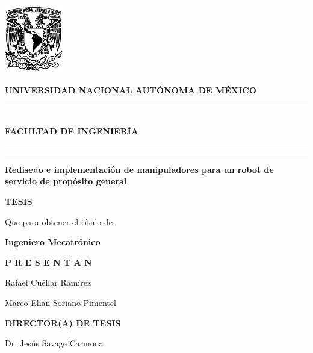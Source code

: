 \documentclass[12pt,twoside]{report}
\begin{document}
\thispagestyle{empty}

\begin{minipage}[t]{20cm}
  \includegraphics[height=3.0cm]{images/escudounam_negro.jpg}
  \hspace{0.5cm}
  \begin{minipage}[b]{14cm}
    \centering
    {\large \textbf{UNIVERSIDAD NACIONAL AUTÓNOMA DE MÉXICO}}\\[6pt]
    \rule{0.9\linewidth}{2pt}\\[6pt]
    {\large\textbf{FACULTAD DE INGENIERÍA}}
  \end{minipage}
\end{minipage}

\begin{minipage}[t]{20cm}
  \vspace{1mm}
  \hspace{0.5cm} %
  \rule{3pt}{450pt}\hspace{15pt}\rule{3pt}{450pt}
  \hspace{1cm} %
  \begin{minipage}[b]{15cm}
    \centering
    \Large\textbf{Rediseño e implementación de manipuladores para un robot de servicio de propósito general}
    \vspace{3cm}

    \Large\textbf{TESIS}
    
    \large Que para obtener el título de
    
    \Large\textbf{Ingeniero Mecatrónico}
    \vspace{2cm}
    
    \Large\textbf{P R E S E N T A N}
    
    \Large Rafael Cuéllar Ramírez
    
    \Large Marco Elian Soriano Pimentel
    \vspace{2cm}
    
    \Large\textbf{DIRECTOR(A) DE TESIS}
    
    \Large Dr. Jesús Savage Carmona
  \end{minipage}
\end{minipage}
\end{document}
